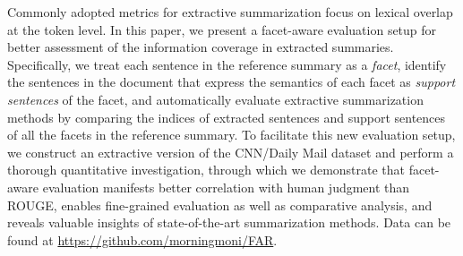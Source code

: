 Commonly adopted metrics for extractive summarization focus on lexical overlap at the token level. In this paper, we present a facet-aware evaluation setup for better assessment of the information coverage in extracted summaries. Specifically, we treat each sentence in the reference summary as a \textit{facet}, identify the sentences in the document that express the semantics of each facet as \textit{support sentences} of the facet, and automatically evaluate extractive summarization methods by comparing the indices of extracted sentences and support sentences of all the facets in the reference summary. To facilitate this new evaluation setup, we construct an extractive version of the CNN/Daily Mail dataset and perform a thorough quantitative investigation, through which we demonstrate that facet-aware evaluation manifests better correlation with human judgment than ROUGE, enables fine-grained evaluation as well as comparative analysis, and reveals valuable insights of state-of-the-art summarization methods. Data can be found at \url{https://github.com/morningmoni/FAR}.
